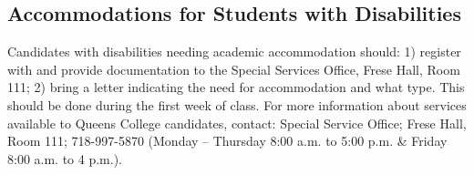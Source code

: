 \subsection*{Accommodations for Students with Disabilities}
 
Candidates with disabilities needing academic accommodation should: 1) register with and provide documentation to the Special Services Office, Frese Hall, Room 111; 2) bring a letter indicating the need for accommodation and what type. This should be done during the first week of class. For more information about services available to Queens College candidates, contact: Special Service Office; Frese Hall, Room 111; 718-997-5870 (Monday – Thursday 8:00 a.m. to 5:00 p.m. \& Friday 8:00 a.m. to 4 p.m.).
